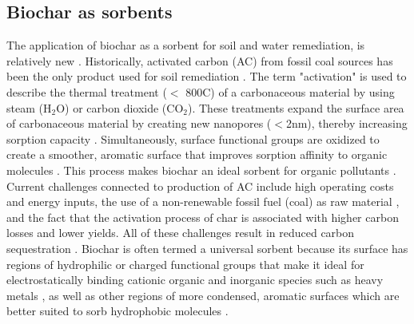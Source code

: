 \subsection{Biochar as sorbents}
The application of biochar as a sorbent for soil and water remediation, is relatively new \citep{beesley2011review}. Historically, activated carbon (\acrshort{AC}) from fossil coal sources has been the only product used for soil remediation \citep{hagemann2018activated}. The term "activation" is used to describe the thermal treatment ($<$ 800\textdegree C) of a carbonaceous material by using steam ($\mathrm{H_2O}$) or carbon dioxide ($\mathrm{CO_2}$). These treatments expand the surface area of carbonaceous material by creating new nanopores ($<$2nm), thereby increasing sorption capacity \citep{LehmannAndJoseph2015}. Simultaneously, surface functional groups are oxidized to create a smoother, aromatic surface that improves sorption affinity to organic molecules \citep{sajjadi2019comprehensive}. This process makes biochar an ideal sorbent for organic pollutants \citep{Ahmad2014}. Current challenges connected to production of AC include high operating costs and energy inputs, the use of a non-renewable fossil fuel (coal) as raw material \citep{Li2019}, and the fact that the activation process of char is associated with higher carbon losses and lower yields. All of these challenges result in reduced carbon sequestration \citep{Sormo2021}. Biochar is often termed a universal sorbent because its surface has  regions of hydrophilic or charged functional groups that make it ideal for electrostatically binding cationic organic and inorganic species such as heavy metals \citep{silvani2019can,zhang2013sorption}, as well as other regions of more condensed, aromatic surfaces which are better suited to sorb hydrophobic molecules \citep{Cornelissen2005}.

